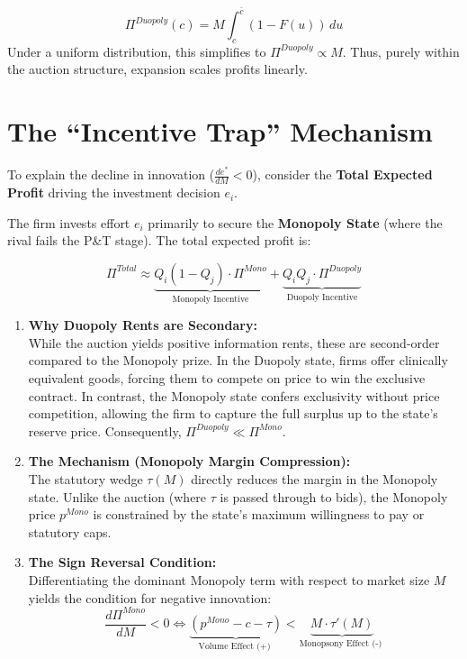 \documentclass[12pt]{article}
\begin{document}
\begin{equation} \label{eq:duopoly_profit}
    \Pi^{Duopoly}(c) = M \int_{c}^{\bar{c}} (1 - F(u)) \, du
\end{equation}
Under a uniform distribution, this simplifies to $\Pi^{Duopoly} \propto M$. Thus, purely within the auction structure, expansion scales profits linearly.

\newpage

\section{The ``Incentive Trap'' Mechanism}
To explain the decline in innovation ($\frac{de^*}{dM} < 0$), consider the \textbf{Total Expected Profit} driving the investment decision $e_i$.

The firm invests effort $e_i$ primarily to secure the \textbf{Monopoly State} (where the rival fails the P\&T stage). The total expected profit is:

\begin{equation}
    \Pi^{Total} \approx \underbrace{Q_i(1-Q_j) \cdot \Pi^{Mono}}_{\text{Monopoly Incentive}} + \underbrace{Q_i Q_j \cdot \Pi^{Duopoly}}_{\text{Duopoly Incentive}}
\end{equation}

\begin{enumerate}
    \item \textbf{Why Duopoly Rents are Secondary:} \\
    While the auction yields positive information rents, these are second-order compared to the Monopoly prize. In the Duopoly state, firms offer clinically equivalent goods, forcing them to compete on price to win the exclusive contract. In contrast, the Monopoly state confers exclusivity without price competition, allowing the firm to capture the full surplus up to the state's reserve price. Consequently, $\Pi^{Duopoly} \ll \Pi^{Mono}$.

    \item \textbf{The Mechanism (Monopoly Margin Compression):} \\
    The statutory wedge $\tau(M)$ directly reduces the margin in the Monopoly state. Unlike the auction (where $\tau$ is passed through to bids), the Monopoly price $p^{Mono}$ is constrained by the state's maximum willingness to pay or statutory caps.

    \item \textbf{The Sign Reversal Condition:} \\
    Differentiating the dominant Monopoly term with respect to market size $M$ yields the condition for negative innovation:
    \begin{equation}
        \frac{d \Pi^{Mono}}{d M} < 0 \iff \underbrace{(p^{Mono} - c - \tau)}_{\text{Volume Effect (+) }} < \underbrace{M \cdot \tau'(M)}_{\text{Monopsony Effect (-) }}
    \end{equation}
\end{enumerate}
\end{document}
